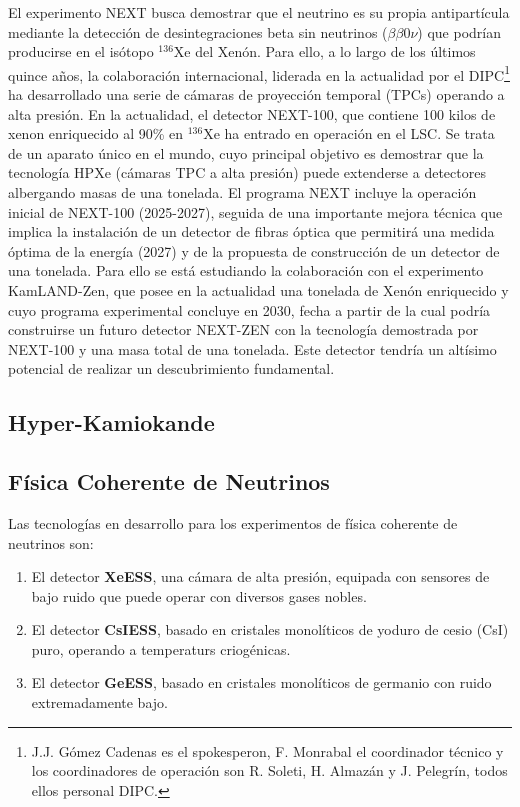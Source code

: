 \documentclass[12pt,a4paper,article]{report} %
\def\xess{{\bf XeESS}}
\def\gess{{\bf GeESS}}
\def\cess{{\bf CsIESS}}
\begin{document}
El experimento NEXT busca demostrar que el neutrino es su propia antipartícula mediante la detección de desintegraciones beta sin neutrinos ($\beta\beta0\nu$) que podrían producirse en el isótopo ${}^{136}$Xe del Xenón. Para ello, a lo largo de los últimos quince años, la colaboración internacional, liderada en la actualidad por el DIPC\footnote{J.J. Gómez Cadenas es el spokesperon, F. Monrabal el coordinador técnico y los coordinadores de operación son R. Soleti, H. Almazán y J. Pelegrín, todos ellos personal DIPC.} ha desarrollado una serie de cámaras de proyección temporal (TPCs) operando a alta presión. En la actualidad, el detector NEXT-100, que contiene 100 kilos de xenon enriquecido al 90\% en ${}^{136}$Xe ha entrado en operación en el LSC. Se trata de un aparato único en el mundo, cuyo principal objetivo es demostrar que la tecnología HPXe (cámaras TPC a alta presión) puede extenderse a detectores albergando masas de una tonelada. El programa NEXT incluye la operación inicial de NEXT-100 (2025-2027), seguida de una importante mejora técnica que implica la instalación de un detector de fibras óptica que permitirá una medida óptima de la energía (2027) y de la propuesta de construcción de un detector de una tonelada. Para ello se está estudiando la colaboración con el experimento KamLAND-Zen, que posee en la actualidad una tonelada de Xenón enriquecido y cuyo programa experimental concluye en 2030, fecha a partir de la cual podría construirse un futuro detector NEXT-ZEN con la tecnología demostrada por NEXT-100 y una masa total de una tonelada.  Este detector tendría un altísimo potencial de realizar un descubrimiento fundamental. 

\subsection*{Hyper-Kamiokande}

\subsection*{Física Coherente de Neutrinos}

Las tecnologías en desarrollo para los experimentos de física coherente de neutrinos son: 

\begin{enumerate}
\item El detector \xess,  una cámara de alta presión, equipada con sensores de bajo ruido que puede operar con diversos gases nobles.  
\item El detector \cess, basado en cristales monolíticos de yoduro de cesio (CsI) puro, operando a temperaturs criogénicas.
\item El detector  \gess, basado en cristales monolíticos de germanio con ruido extremadamente bajo.
\end{enumerate}
\end{document}
